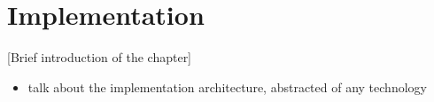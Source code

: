 \chapter{Implementation}
[Brief introduction of the chapter]

{\color{red}
\begin{itemize}
    \item talk about the implementation architecture, abstracted of any technology
\end{itemize}
}
